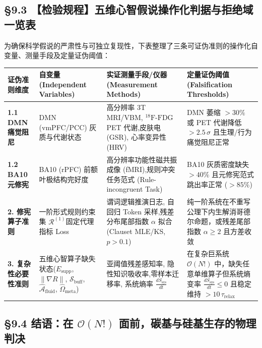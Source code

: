 \documentclass[11pt,a4paper,oneside]{ctexart}
\begin{document}
\subsection{§9.3 【检验规程】五维心智假说操作化判据与拒绝域一览表}

为确保科学假说的严肃性与可独立复现性，下表整理了三条可证伪准则的操作化自变量、测量手段及定量证伪阈值：


\begin{table}[htbp]
\centering
\small
\begin{tabular}{p{2.5cm}p{3.5cm}p{4.2cm}p{4.2cm}}
\toprule
证伪准则维度 & 自变量 (Independent Variables) & 实证测量手段/仪器 (Measurement Methods) & 定量证伪阈值 (Falsification Thresholds) \\
\midrule
\textbf{1.1 DMN 痛觉阻尼} & DMN (vmPFC/PCC) 灰质与代谢状态 & 高分辨率 3T MRI/VBM, $^{18}\text{F-FDG}$ PET 代谢,\newline 皮肤电 (GSR), 心率变异性 (HRV) & DMN 萎缩 $>30\%$ 或 PET 代谢降低 $>2.5\,\sigma$ 且生理/行为痛觉阻尼正常 \\
\textbf{1.2 BA10 元修宪} & BA10 (rPFC) 前额叶极结构完好度 & 高分辨率功能性磁共振成像 (fMRI),\newline 规则冲突任务范式 (Rule-incongruent Task) & BA10 灰质密度缺失 $>40\%$ 且元修宪范式跳出率正常 ($>85\%$) \\
\textbf{2. 修宪算子准则} & 一阶形式规则约束集 $\mathcal{R}^{(1)}$\newline 固定代理指标 Loss & 谓词逻辑推演日志, 自回归 Token 采样,\newline 残差分布尾部指数 $\alpha$ 拟合 (Clauset MLE/KS, $p>0.1$) & 纯一阶系统在不重写公理下内生解消哥德尔命题，或残差尾部指数 $\alpha \ge 2$ 且方差收敛 \\
\textbf{3. 复杂性必要性准则} & 五维心智算子缺失状态\newline ($E_{\text{supp}}$, $\|\nabla R\|$, $\mathcal{S}_{\text{buff}}$, $\hat{\mathcal{A}}_{\text{fluid}}$, $\hat{\Omega}_{\text{meta}}$) & 亚阈值残差感知率, 隐性知识吸收率,\newline 零样本迁移率, 系统熵率 $\frac{dS_{\text{sys}}}{dt}$ & 在复杂巨系统 $\mathcal{O}(N!)$ 中，缺失任意单维算子但系统熵变率 $\frac{dS_{\text{sys}}}{dt} \le 0$ 且稳定维持 $>10\,\tau_{\text{relax}}$ \\
\bottomrule
\end{tabular}
\end{table}

\subsection{§9.4 结语：在 \texorpdfstring{$\mathcal{O}(N!)$}{O(N!)} 面前，碳基与硅基生存的物理判决}
\end{document}
